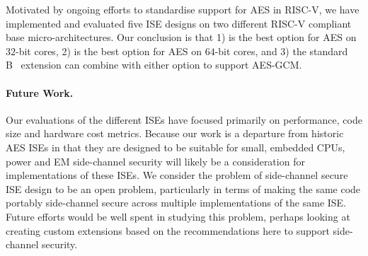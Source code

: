 

Motivated by ongoing efforts to standardise support 
for AES in RISC-V, we have implemented and evaluated five ISE designs 
on two different RISC-V compliant base micro-architectures.
Our conclusion is that
1) 
   is the best option for 
   AES on $32$-bit cores,
2) 
   is the best option for 
   AES on $64$-bit cores,
   and
3) the
   standard 
   B~\cite[Section 17]{RV:ISA:I:19}
   extension
   can combine with either option to support AES-GCM.

\paragraph{Future Work.}
Our evaluations of the different ISEs have focused primarily on
performance, code size and hardware cost metrics.
Because our work is a departure from historic
AES ISEs in that they are designed to be suitable for small, embedded
CPUs, power and EM side-channel security will likely be a consideration
for implementations of these ISEs.
We consider the problem of side-channel secure ISE design to be an
open problem, particularly in terms of making the same code portably
side-channel secure across multiple implementations of the same ISE.
Future efforts would be well spent in studying this problem, perhaps
looking at creating custom extensions based on the recommendations here
to support side-channel security.

%

